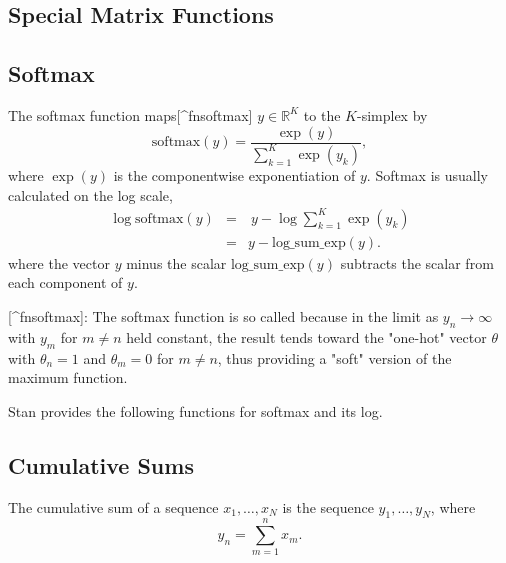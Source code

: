 \begin{description}
{\begin{description}
\section{Special Matrix Functions}\label{softmax.section}


\subsection{Softmax}


The softmax function maps[^fnsoftmax] $y \in \mathbb{R}^K$ to the $K$-simplex by \[ \text{softmax}(y)  = \frac{\exp(y)}         {\sum_{k=1}^K \exp(y_k)}, \] where $\exp(y)$ is the componentwise exponentiation of $y$. Softmax is usually calculated on the log scale, \begin{eqnarray*} \log \text{softmax}(y) & = & \ y - \log \sum_{k=1}^K \exp(y_k) \\[4pt] & = & y - \mathrm{log\_sum\_exp}(y). \end{eqnarray*} where the vector $y$ minus the scalar $\mathrm{log\_sum\_exp}(y)$ subtracts the scalar from each component of $y$.

[^fnsoftmax]: The softmax function is so called because in the limit as   $y_n \rightarrow \infty$ with $y_m$ for $m \neq n$ held constant,   the result tends toward the "one-hot" vector $\theta$ with   $\theta_n = 1$ and $\theta_m = 0$ for $m \neq n$, thus providing a   "soft" version of the maximum function.

Stan provides the following functions for softmax and its log.

\begin{description}   \end{description}

\subsection{Cumulative Sums}

The cumulative sum of a sequence $x_1,\ldots,x_N$ is the sequence $y_1,\ldots,y_N$, where \[ y_n = \sum_{m = 1}^{n} x_m. \] 

\begin{description}    \end{description}



\end{description}}
\end{description}
